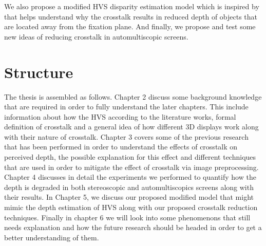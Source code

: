 We also propose a modified HVS disparity estimation model which is inspired by \cite{filippini2009limits} that helps understand why the crosstalk results in reduced depth of objects that are located away from the fixation plane. And finally, we propose and test some new ideas of reducing crosstalk in automultiscopic screens.

\section{Structure}

The thesis is assembled as follows. Chapter 2 discuss some background knowledge that are required in order to fully understand the later chapters. This include information about how the HVS according to the literature works, formal definition of crosstalk and a general idea of how different 3D displays work along with their nature of crosstalk. Chapter 3 covers some of the previous research that has been performed in order to understand the effects of crosstalk on perceived depth, the possible explanation for this effect and different techniques that are used in order to mitigate the effect of crosstalk via image preprocessing. Chapter 4 discusses in detail the experiments we performed to quantify how the depth is degraded in both stereoscopic and automultiscopics screens along with their results. In Chapter 5, we discuss our proposed modified model that might mimic the depth estimation of HVS along with our proposed crosstalk reduction techniques. Finally in chapter 6 we will look into some phenomenons that still needs explanation and how the future research should be headed in order to get a better understanding of them.



